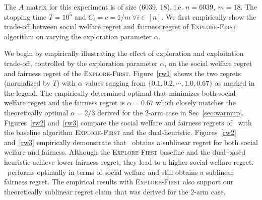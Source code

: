 The $A$ matrix for this experiment is of size (6039, 18), i.e. $n=6039, \ m=18$. The stopping time $T=10^5$ and $C_i=c=1/m\ \forall i\in [n]$. We first empirically show the trade-off between social welfare regret and fairness regret of \textsc{Explore-First} algorithm on varying the exploration parameter $\alpha$.

We begin by empirically illustrating the effect of exploration and exploitation trade-off, controlled by the exploration parameter $\alpha$, on the social welfare regret and fairness regret of the \textsc{Explore-First}. Figure~\ref{rw1} shows the two regrets (normalized by $T$) with $\alpha$ values ranging from $\{0.1, 0.2, \cdots , 1.0, 0.67\}$ as marked in the legend. The empirically determined optimal that minimizes both social welfare regret and the fairness regret is $\alpha=0.67$ which closely matches the theoretically optimal $\alpha=2/3$ derived for the 2-arm case in Sec~\ref{sec:warmup}. Figures~\ref{rw2} and~\ref{rw3} compare the social welfare and fairness regrets of \ouralgo\ with the baseline algorithm \textsc{Explore-First} and the dual-heuristic. Figures~\ref{rw2} and~\ref{rw3} empirically demonstrate that \ouralgo\ obtains a sublinear regret for both social welfare and fairness. Although the \textsc{Explore-First} baseline and the dual-based heuristic achieve lower fairness regret, they lead to a higher social welfare regret. \ouralgo\ performs optimally in terms of social welfare and still obtains a sublinear fairness regret. The empirical results with \textsc{Explore-First} also support our theoretically sublinear regret claim that was derived for the 2-arm case. 


\iffalse 

